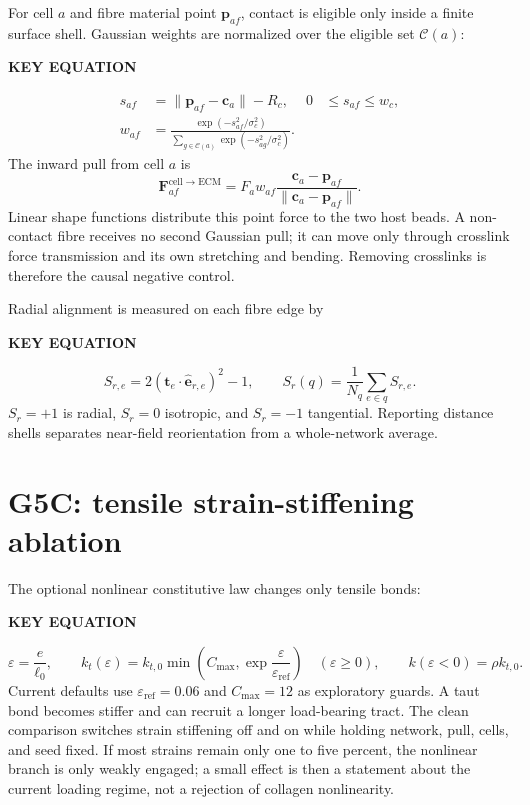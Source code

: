 \documentclass[10.5pt]{article}
\newcommand{\cv}{\mathbf c}
\newcommand{\Fv}{\mathbf F}
\newcommand{\ev}{\widehat{\mathbf e}}
\newcommand{\keylabel}{\par\smallskip\noindent\textcolor{g5}{\textbf{KEY EQUATION}}\par\vspace{-5pt}}
\begin{document}
For cell $a$ and fibre material point $\mathbf p_{af}$, contact is eligible only inside a finite
surface shell. Gaussian weights are normalized over the eligible set $\mathcal C(a)$:
\keylabel
\begin{align}
 s_{af}&=\lVert\mathbf p_{af}-\cv_a\rVert-R_c,
 &0&\le s_{af}\le w_c,\\
 w_{af}&=\frac{\exp(-s_{af}^2/\sigma_c^2)}
 {\displaystyle\sum_{g\in\mathcal C(a)}\exp(-s_{ag}^2/\sigma_c^2)}.
 \label{eq:contact}
\end{align}
The inward pull from cell $a$ is
\begin{equation}
 \Fv_{af}^{\mathrm{cell\to ECM}}
 =F_a w_{af}\frac{\cv_a-\mathbf p_{af}}
 {\lVert\cv_a-\mathbf p_{af}\rVert}.
 \label{eq:pull}
\end{equation}
Linear shape functions distribute this point force to the two host beads. A non-contact fibre
receives no second Gaussian pull; it can move only through crosslink force transmission and its
own stretching and bending. Removing crosslinks is therefore the causal negative control.

Radial alignment is measured on each fibre edge by
\keylabel
\begin{equation}
 S_{r,e}=2(\mathbf t_e\cdot\ev_{r,e})^2-1,
 \qquad
 S_r(q)=\frac{1}{N_q}\sum_{e\in q}S_{r,e}.
 \label{eq:radial}
\end{equation}
$S_r=+1$ is radial, $S_r=0$ isotropic, and $S_r=-1$ tangential. Reporting distance shells
separates near-field reorientation from a whole-network average.

\section{G5C: tensile strain-stiffening ablation}

The optional nonlinear constitutive law changes only tensile bonds:
\keylabel
\begin{equation}
 \varepsilon=\frac{e}{\ell_0},\qquad
 k_t(\varepsilon)=k_{t,0}
 \min\!\left(C_{\max},\exp\!\frac{\varepsilon}{\varepsilon_{\mathrm{ref}}}\right)
 \quad(\varepsilon\ge0),
 \qquad
 k(\varepsilon<0)=\rho k_{t,0}.
 \label{eq:stiffening}
\end{equation}
Current defaults use $\varepsilon_{\mathrm{ref}}=0.06$ and $C_{\max}=12$ as exploratory
guards. A taut bond becomes stiffer and can recruit a longer load-bearing tract. The clean
comparison switches strain stiffening off and on while holding network, pull, cells, and seed
fixed. If most strains remain only one to five percent, the nonlinear branch is only weakly
engaged; a small effect is then a statement about the current loading regime, not a rejection of
collagen nonlinearity.
\end{document}
